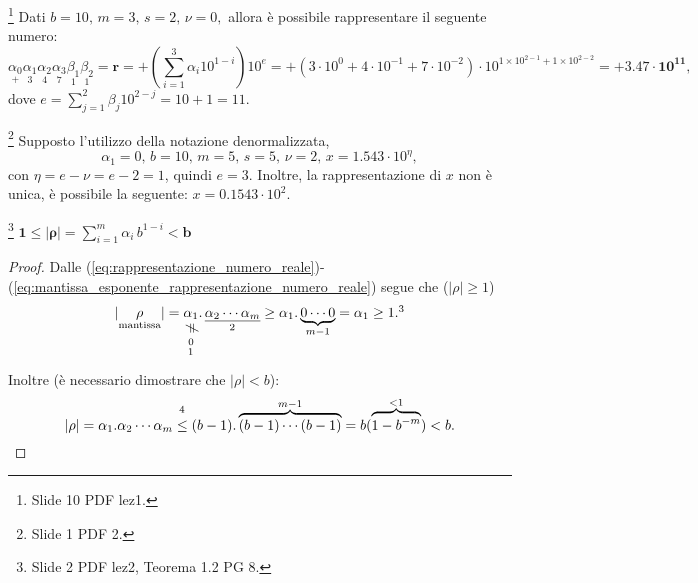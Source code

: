 \begin{example}\footnote{Slide 10 PDF lez1.}
	Dati $b=10,\, m=3,\, s=2,\, \nu=0,$ allora è possibile rappresentare il seguente numero:
	\begin{equation*}
		\underset{+}{\alpha_0}\underset{3}{\alpha_1}\underset{4}{\alpha_2}\underset{7}{\alpha_3}\underset{1}{\beta_1}\underset{1}{\beta_2}=\boldsymbol r=+\left(\sum_{i=1}^3\alpha_i10^{1-i}\right)10^{e}=+(3\cdot 10^0+4\cdot 10^{-1}+7\cdot 10^{-2})\cdot 10^{1\times 10^{2-1} + 1\times 10^{2-2}}=\boldsymbol{+3.47\cdot 10^{11}},
	\end{equation*}
	dove $e=\sum_{j=1}^2\beta_j10^{2-j}=10+1=11.$
\end{example}
\begin{example}
	\footnote{Slide 1 PDF 2.} Supposto l'utilizzo della notazione denormalizzata,
	\begin{equation*}
		\alpha_1=0,\, b=10,\, m=5,\, s=5,\, \nu=2,\, x=1.543\cdot 10^\eta,
	\end{equation*}
	con $\eta=e-\nu=e-2=1$, quindi $e=3$. Inoltre, la rappresentazione di $x$ non è unica, è possibile la seguente: $x=0.1543\cdot 10^2.$ 
\end{example}

\begin{theorem}\footnote{Slide 2 PDF lez2, Teorema 1.2 PG 8.}
	$\boldsymbol{1\leq |\rho|}=\sum_{i=1}^m \alpha_i\, b^{1-i}\boldsymbol{<b}$
\end{theorem}
\begin{proof}
	Dalle (\ref{eq:rappresentazione_numero_reale})-(\ref{eq:mantissa_esponente_rappresentazione_numero_reale}) segue che ($|\rho|\geq 1$)
	\begin{equation*}
		|\underset{\text{mantissa}}{\rho}|= \underset{\footnotemark}{\neqto{\alpha_1}{0}}.\,\underset{\footnotemark}{\uline{\alpha_2\cdots\alpha_m}}\geq\alpha_1.\underbrace{0\cdots 0}_{m-1}=\alpha_1\geq 1.\footnotemark
	\end{equation*}
	Inoltre (è necessario dimostrare che $|\rho|<b$):
	\begin{equation*}
		|\rho|=\alpha_1.\alpha_2\cdots\alpha_m\overset{\footnotemark}{\leq}(b-1).\overbrace{(b-1)\cdots (b-1)}^{m-1}=b(\overbrace{1-b^{-m}}^{<1})<b.
	\end{equation*}
\end{proof}
\addtocounter{footnote}{-3}


